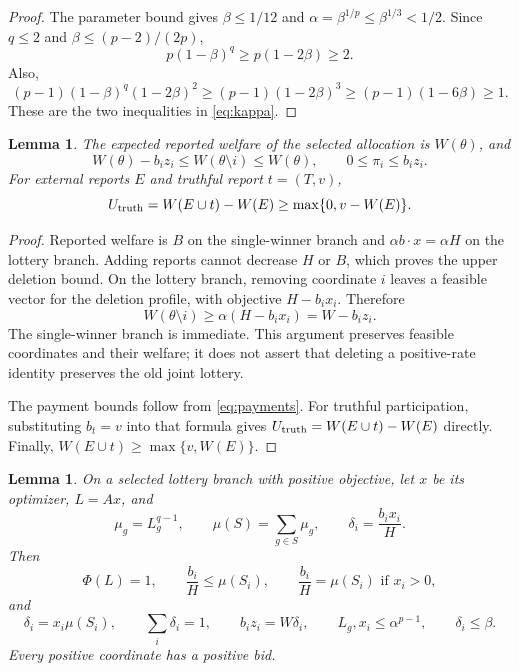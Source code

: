 \documentclass[11pt]{article}
\newtheorem{lemma}[theorem]{Lemma}
\begin{document}
\begin{proof}
The parameter bound gives $\beta\le1/12$ and
$\alpha=\beta^{1/p}\le\beta^{1/3}<1/2$.
Since $q\le2$ and $\beta\le(p-2)/(2p)$,
\[
p(1-\beta)^q
\ge p(1-2\beta)
\ge2.
\]
Also,
\[
(p-1)(1-\beta)^q(1-2\beta)^2
\ge(p-1)(1-2\beta)^3
\ge(p-1)(1-6\beta)
\ge1.
\]
These are the two inequalities in \eqref{eq:kappa}.
\end{proof}

\begin{lemma}
\label{lem:payments}
The expected reported welfare of the selected allocation is
$W(\theta)$, and
\begin{equation}
\label{eq:payment-bounds}
W(\theta)-b_i z_i
\le W(\theta\setminus i)
\le W(\theta),
\qquad
0\le\pi_i\le b_i z_i.
\end{equation}
For external reports $E$ and truthful report $t=(T,v)$,
\begin{equation}
\label{eq:truthful-utility}
U_{\rm truth}
=W(E\cup t)-W(E)
\ge\max\{0,v-W(E)\}.
\end{equation}
\end{lemma}

\begin{proof}
Reported welfare is $B$ on the single-winner branch and
$\alpha b\cdot x=\alpha H$ on the lottery branch.
Adding reports cannot decrease $H$ or $B$, which proves the upper
deletion bound.
On the lottery branch, removing coordinate $i$ leaves a feasible
vector for the deletion profile, with objective $H-b_ix_i$.
Therefore
\[
W(\theta\setminus i)
\ge\alpha(H-b_ix_i)
=W-b_i z_i.
\]
The single-winner branch is immediate.
This argument preserves feasible coordinates and their welfare;
it does not assert that deleting a positive-rate identity
preserves the old joint lottery.

The payment bounds follow from \eqref{eq:payments}.
For truthful participation, substituting $b_t=v$ into that formula
gives $U_{\rm truth}=W(E\cup t)-W(E)$ directly.
Finally, $W(E\cup t)\ge\max\{v,W(E)\}$.
\end{proof}

\begin{lemma}
\label{lem:kkt}
On a selected lottery branch with positive objective, let $x$ be
its optimizer, $L=Ax$, and
\[
\mu_g=L_g^{q-1},
\qquad
\mu(S)=\sum_{g\in S}\mu_g,
\qquad
\delta_i=\frac{b_ix_i}{H}.
\]
Then
\begin{equation}
\label{eq:kkt}
\Phi(L)=1,
\qquad
\frac{b_i}{H}\le\mu(S_i),
\qquad
\frac{b_i}{H}=\mu(S_i)\text{ if }x_i>0,
\end{equation}
and
\begin{equation}
\label{eq:caps}
\delta_i=x_i\mu(S_i),
\qquad
\sum_i\delta_i=1,
\qquad
b_i z_i=W\delta_i,
\qquad
L_g,x_i\le\alpha^{p-1},
\qquad
\delta_i\le\beta.
\end{equation}
Every positive coordinate has a positive bid.
\end{lemma}
\end{document}
